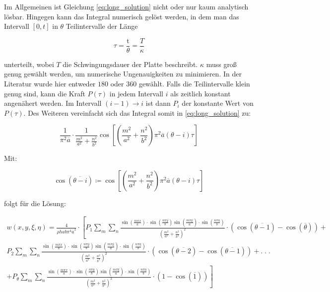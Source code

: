 Im Allgemeinen ist Gleichung \ref{eq:long_solution} nicht oder nur kaum analytisch lösbar. Hingegen kann das Integral numerisch gelöst werden, in dem man das Intervall $\left[ 0,t \right]$ in $\theta$ Teilintervalle der Länge

 \begin{equation}
 	\tau = \dfrac{\mbox{t}}{\theta}=\dfrac{T}{\kappa}
 \end{equation}
 
 unterteilt, wobei $T$ die Schwingungsdauer der Platte beschreibt. $\kappa$ muss groß genug gewählt werden, um numerische Ungenauigkeiten zu minimieren. In der Literatur wurde hier entweder $180$ oder $360$ gewählt. Falls die Teilintervalle klein genug sind, kann die Kraft $P(\tau	)$ in jedem Intervall $i$ als zeitlich konstant angenähert werden. Im Intervall $(i-1) \rightarrow i$ ist dann $P_{i}$ der konstante Wert von $P(\tau)$. Des Weiteren vereinfacht sich das Integral somit in \ref{eq:long_solution} zu:
 
 \begin{equation}
 	\frac{1}{\pi^2\overline{a}} \cdot \frac{1}{\frac{m^2}{a^2}+\frac{n^2}{b^2}} \cos \left[ \left( \frac{m^2}{a^2}+\frac{n^2}{b^2} \right) \pi^2\overline{a}(\theta - i)\tau\right]
 \end{equation}  
 
Mit:

$$\cos\left(\overline{\theta - i}\right) \coloneqq \cos \left[ \left( \frac{m^2}{a^2}+\frac{n^2}{b^2} \right) \pi^2\overline{a}(\theta - i)\tau\right] $$

\newpage

folgt für die Lösung:

\begin{equation}
\begin{multlined}
	w(x,y,\xi, \eta) = \frac{4}{\rho h a b \pi^4 \overline{a}^2} \cdot \left[ P_{1} \sum_m \sum_n \frac{\sin\left(\frac{m \pi x}{a}\right) \cdot \sin\left(\frac{n \pi y}{b}\right) \sin\left(\frac{m \pi \xi}{a}\right) \cdot \sin\left(\frac{n \pi \eta}{b}\right)	}{ \left( \frac{m^2}{a^2} + \frac{n^2}{b^2} \right)^2} \cdot \left( \cos(\overline{\theta-1}) - \cos(\overline{\theta}) \right) + \right. \\ P_{2} \sum_m \sum_n \frac{\sin\left(\frac{m \pi x}{a}\right) \cdot \sin\left(\frac{n \pi y}{b}\right) \sin\left(\frac{m \pi \xi}{a}\right) \cdot \sin\left(\frac{n \pi \eta}{b}\right)	}{ \left( \frac{m^2}{a^2} + \frac{n^2}{b^2} \right)^2} \cdot \left( \cos(\overline{\theta-2}) - \cos(\overline{\theta-1}) \right) + . \; . \; .\ \\ \left. + P_{\theta} \sum_m \sum_n \frac{\sin\left(\frac{m \pi x}{a}\right) \cdot \sin\left(\frac{n \pi y}{b}\right) \sin\left(\frac{m \pi \xi}{a}\right) \cdot \sin\left(\frac{n \pi \eta}{b}\right)	}{ \left( \frac{m^2}{a^2} + \frac{n^2}{b^2} \right)^2} \cdot \left( 1 - \cos(\overline{1}) \right) \right]
	\label{eq:horror}
\end{multlined}
\end{equation}


